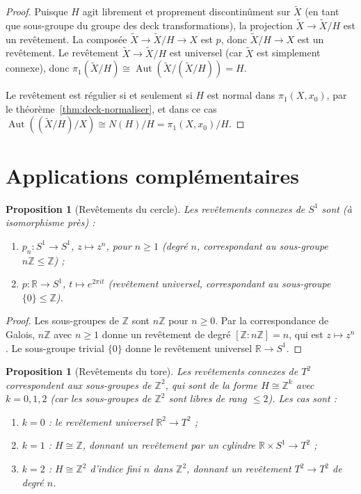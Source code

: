 \documentclass[12pt,a4paper,openany]{book}
\theoremstyle{definition}
\theoremstyle{plain}
\newtheorem{proposition}[definition]{Proposition}
\theoremstyle{remark}
\newcommand{\Z}{\mathbb{Z}}
\newcommand{\R}{\mathbb{R}}
\DeclareMathOperator{\Aut}{Aut}
\begin{document}
\begin{proof}
Puisque $H$ agit librement et proprement discontinûment sur $\widetilde{X}$ (en tant
que sous-groupe du groupe des deck transformations), la projection
$\widetilde{X} \to \widetilde{X}/H$ est un revêtement. La composée
$\widetilde{X} \to \widetilde{X}/H \to X$ est $p$, donc $\widetilde{X}/H \to X$
est un revêtement. Le revêtement $\widetilde{X} \to \widetilde{X}/H$ est universel
(car $\widetilde{X}$ est simplement connexe), donc
$\pi_1(\widetilde{X}/H) \cong \Aut(\widetilde{X}/(\widetilde{X}/H)) = H$.

Le revêtement est régulier si et seulement si $H$ est normal dans $\pi_1(X, x_0)$,
par le théorème~\ref{thm:deck-normaliser}, et dans ce cas
$\Aut((\widetilde{X}/H)/X) \cong N(H)/H = \pi_1(X,x_0)/H$.
\end{proof}

\section{Applications complémentaires}\label{sec:applications-rev}

\begin{proposition}[Revêtements du cercle]\label{prop:rev-cercle}
Les revêtements connexes de $S^1$ sont (à isomorphisme près) :
\begin{enumerate}[label=(\roman*)]
\item $p_n \colon S^1 \to S^1$, $z \mapsto z^n$, pour $n \geq 1$ (degré $n$,
correspondant au sous-groupe $n\Z \leq \Z$) ;
\item $p \colon \R \to S^1$, $t \mapsto e^{2\pi it}$ (revêtement universel,
correspondant au sous-groupe $\{0\} \leq \Z$).
\end{enumerate}
\end{proposition}

\begin{proof}
Les sous-groupes de $\Z$ sont $n\Z$ pour $n \geq 0$. Par la correspondance de Galois,
$n\Z$ avec $n \geq 1$ donne un revêtement de degré $[\Z : n\Z] = n$, qui est $z \mapsto z^n$.
Le sous-groupe trivial $\{0\}$ donne le revêtement universel $\R \to S^1$.
\end{proof}

\begin{proposition}[Revêtements du tore]\label{prop:rev-tore}
Les revêtements connexes de $T^2$ correspondent aux sous-groupes de $\Z^2$, qui sont
de la forme $H \cong \Z^k$ avec $k = 0, 1, 2$ (car les sous-groupes de $\Z^2$ sont libres
de rang $\leq 2$). Les cas sont :
\begin{enumerate}[label=(\roman*)]
\item $k=0$ : le revêtement universel $\R^2 \to T^2$ ;
\item $k=1$ : $H \cong \Z$, donnant un revêtement par un cylindre $\R \times S^1 \to T^2$ ;
\item $k=2$ : $H \cong \Z^2$ d'indice fini $n$ dans $\Z^2$, donnant un revêtement $T^2 \to T^2$
de degré $n$.
\end{enumerate}
\end{proposition}
\end{document}
